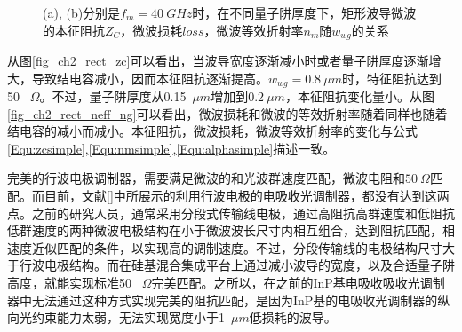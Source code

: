 \begin{figure}[htb]
	\small
\caption{(a), (b)分别是$f_m = 40~GHz$时，在不同量子阱厚度下，矩形波导微波的本征阻抗$Z_C$，微波损耗$loss$，微波等效折射率$n_m$随$w_{wg}$的关系}
\label{fig_ch2_rect_property}	
\end{figure}
从图\ref{fig_ch2_rect_zc}可以看出，当波导宽度逐渐减小时或者量子阱厚度逐渐增大，导致结电容减小，因而本征阻抗逐渐提高。$w_{wg} = 0.8~ \mu m$时，特征阻抗达到50~ $\Omega$。不过，量子阱厚度从0.15~$\mu m$增加到$0.2~\mu m$，本征阻抗变化量小。从图\ref{fig_ch2_rect_neff_ng}可以看出，微波损耗和微波的等效折射率随着同样也随着结电容的减小而减小。本征阻抗，微波损耗，微波等效折射率的变化与公式\ref{Equ:zcsimple},\ref{Equ:nmsimple},\ref{Equ:alphasimple}描述一致。

完美的行波电极调制器，需要满足微波的和光波群速度匹配，微波电阻和$50~\Omega$匹配。而目前，文献[]中所展示的利用行波电极的电吸收光调制器，都没有达到这两点。之前的研究人员，通常采用分段式传输线电极，通过高阻抗高群速度和低阻抗低群速度的两种微波电极结构在小于微波波长尺寸内相互组合，达到阻抗匹配，相速度近似匹配的条件，以实现高的调制速度\cite{tang2012over,yuphd,Robertphd}。不过，分段传输线的电极结构尺寸大于行波电极结构。而在硅基混合集成平台上通过减小波导的宽度，以及合适量子阱高度，就能实现标准50~ $\Omega$完美匹配。之所以，在之前的InP基电吸收吸收光调制器中无法通过这种方式实现完美的阻抗匹配，是因为InP基的电吸收光调制器的纵向光约束能力太弱，无法实现宽度小于1~$\mu m$低损耗的波导。

